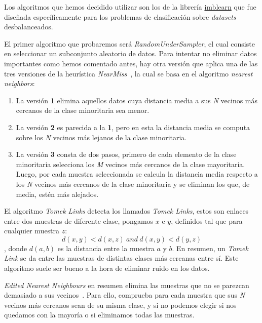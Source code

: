 Los algoritmos que hemos decidido utilizar son los de la librería \href{https://imbalanced-learn.org/stable/}{imblearn} que fue diseñada específicamente para los problemas de clasificación sobre \textit{datasets} desbalanceados.\ \cite{3Undersa98:online}

El primer algoritmo que probaremos será \textit{RandomUnderSampler}, el cual consiste en seleccionar un subconjunto aleatorio de datos. Para intentar no eliminar datos importantes como hemos comentado antes, hay otra versión que aplica una de las tres versiones de la heurística \textit{NearMiss}\ \cite{3Undersa98:online}, la cual se basa en el algoritmo \textit{nearest neighbors}:

\begin{enumerate}
    \item La versión \textbf{1} elimina aquellos datos cuya distancia media a sus \textit{N} vecinos más cercanos de la clase minoritaria sea menor.
    \item La versión \textbf{2} es parecida a la \textbf{1}, pero en esta la distancia media se computa sobre los \textit{N} vecinos más lejanos de la clase minoritaria.
    \item La versión \textbf{3} consta de dos pasos, primero de cada elemento de la clase minoritaria selecciona los \textit{M} vecinos más cercanos de la clase mayoritaria. Luego, por cada muestra seleccionada se calcula la distancia media respecto a los \textit{N} vecinos más cercanos de la clase minoritaria y se eliminan los que, de media, estén más alejados.
\end{enumerate}

El algoritmo \textit{Tomek Links} detecta los llamados \textit{Tomek Links}, estos son enlaces entre dos muestras de diferente clase, pongamos \(x\) e \(y\), definidos tal que para cualquier muestra \(z\): 
\[d(x,y) < d(x,z)\ and\ d(x,y) < d(y,z)\], donde \(d(a, b)\) es la distancia entre la muestra \(a\) y \(b\). En resumen, un \textit{Tomek Link} se da entre las muestras de distintas clases más cercanas entre sí. Este algoritmo suele ser bueno a la hora de eliminar ruido en los datos.

\textit{Edited Nearest Neighbours} en resumen elimina las muestras que no se parezcan demasiado a sus vecinos\ \cite{Wil72}. Para ello, comprueba para cada muestra que sus \textit{N} vecinos más cercanos sean de su misma clase, y si no podemos elegir si nos quedamos con la mayoría o si eliminamos todas las muestras.

